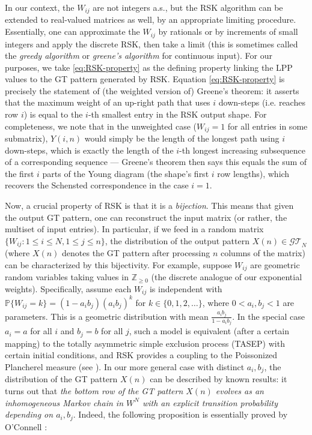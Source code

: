 \documentclass[letterpaper,11pt,oneside,reqno]{article}
\numberwithin{equation}{section}
\theoremstyle{definition}
\begin{document}
In our context, the $W_{ij}$ are not integers a.s., but the RSK algorithm can be extended to real-valued matrices as well, by an appropriate limiting procedure. Essentially, one can approximate the $W_{ij}$ by rationals or by increments of small integers and apply the discrete RSK, then take a limit (this is sometimes called the \emph{greedy algorithm} or \emph{greene's algorithm} for continuous input). For our purposes, we take \eqref{eq:RSK-property} as the defining property linking the LPP values to the GT pattern generated by RSK. Equation \eqref{eq:RSK-property} is precisely the statement of (the weighted version of) Greene's theorem: it asserts that the maximum weight of an up-right path that uses $i$ down-steps (i.e. reaches row $i$) is equal to the $i$-th smallest entry in the RSK output shape. For completeness, we note that in the unweighted case ($W_{ij}=1$ for all entries in some submatrix), $Y(i,n)$ would simply be the length of the longest path using $i$ down-steps, which is exactly the length of the $i$-th longest increasing subsequence of a corresponding sequence --- Greene's theorem then says this equals the sum of the first $i$ parts of the Young diagram (the shape's first $i$ row lengths), which recovers the Schensted correspondence in the case $i=1$.

Now, a crucial property of RSK is that it is a \emph{bijection}. This means that given the output GT pattern, one can reconstruct the input matrix (or rather, the multiset of input entries). In particular, if we feed in a random matrix $\{W_{ij}:1\le i\le N, 1\le j\le n\}$, the distribution of the output pattern $X(n)\in \mathcal{GT}_N$ (where $X(n)$ denotes the GT pattern after processing $n$ columns of the matrix) can be characterized by this bijectivity. For example, suppose $W_{ij}$ are geometric random variables taking values in $\mathbb{Z}_{\ge0}$ (the discrete analogue of our exponential weights). Specifically, assume each $W_{ij}$ is independent with $\mathbb{P}\{W_{ij}=k\} = (1-a_i b_j) (a_i b_j)^k$ for $k\in\{0,1,2,\dots\}$, where $0<a_i, b_j <1$ are parameters. This is a geometric distribution with mean $\frac{a_i b_j}{1-a_i b_j}$. In the special case $a_i = a$ for all $i$ and $b_j=b$ for all $j$, such a model is equivalent (after a certain mapping) to the totally asymmetric simple exclusion process (TASEP) with certain initial conditions, and RSK provides a coupling to the Poissonized Plancherel measure (see \cite{OConnell2003}). In our more general case with distinct $a_i, b_j$, the distribution of the GT pattern $X(n)$ can be described by known results: it turns out that \emph{the bottom row of the GT pattern $X(n)$ evolves as an inhomogeneous Markov chain in $W^N$ with an explicit transition probability depending on $a_i, b_j$}. Indeed, the following proposition is essentially proved by O'Connell \cite{OConnell2003}:
\end{document}
